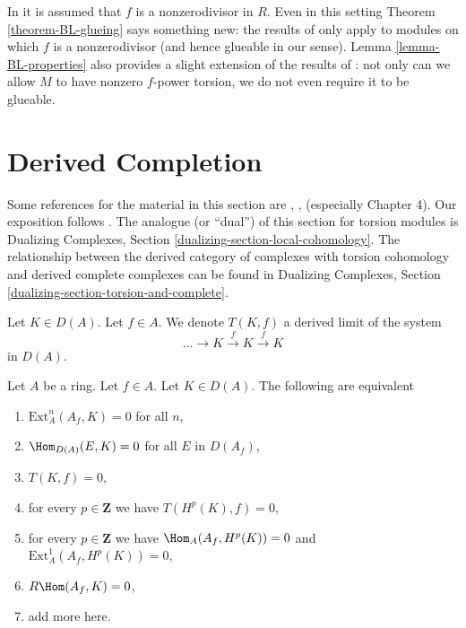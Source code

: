 \begin{remark}
\label{remark-compare-BL}
In \cite{Beauville-Laszlo} it is assumed that $f$ is a nonzerodivisor in $R$.
Even in this setting Theorem \ref{theorem-BL-glueing} says something new: the 
results of \cite{Beauville-Laszlo} only apply to modules on which
$f$ is a nonzerodivisor (and hence glueable in our sense).
Lemma \ref{lemma-BL-properties} also provides a slight extension
of the results of  \cite{Beauville-Laszlo}: not only can we allow $M$
to have nonzero $f$-power torsion, we do not even require it to be glueable.
\end{remark}










\section{Derived Completion}
\label{section-derived-completion}

\noindent
Some references for the material in this section are
\cite{Dwyer-Greenlees}, \cite{Greenlees-May}, \cite{dag12}
(especially Chapter 4). Our exposition follows \cite{BS}.
The analogue (or ``dual'') of this section for torsion modules
is Dualizing Complexes, Section \ref{dualizing-section-local-cohomology}.
The relationship between the derived category of complexes with
torsion cohomology and derived complete complexes can be found
in Dualizing Complexes, Section \ref{dualizing-section-torsion-and-complete}.

\medskip\noindent
Let $K \in D(A)$. Let $f \in A$. We denote $T(K, f)$ a derived limit
of the system
$$
\ldots \to K \xrightarrow{f} K \xrightarrow{f} K
$$
in $D(A)$.

\begin{lemma}
\label{lemma-hom-from-Af}
Let $A$ be a ring. Let $f \in A$. Let $K \in D(A)$.
The following are equivalent
\begin{enumerate}
\item $\text{Ext}^n_A(A_f, K) = 0$ for all $n$,
\item $\Hom_{D(A)}(E, K) = 0$ for all $E$ in $D(A_f)$,
\item $T(K, f) = 0$,
\item for every $p \in \mathbf{Z}$ we have $T(H^p(K), f) = 0$,
\item for every $p \in \mathbf{Z}$ we have
$\Hom_A(A_f, H^p(K)) = 0$ and $\text{Ext}^1_A(A_f, H^p(K)) = 0$,
\item $R\Hom(A_f, K) = 0$,
\item add more here.
\end{enumerate}
\end{lemma}

